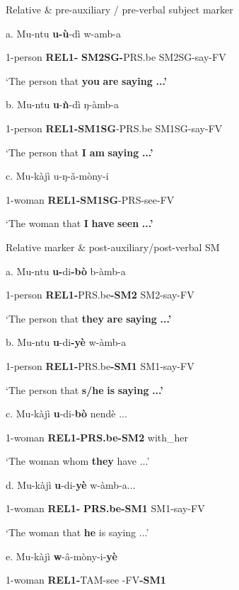 \documentclass[output=paper]{langscibook}
\begin{document}
\ea%
    \label{ex:lukusa:62}
    \z

          Relative \& pre-auxiliary / pre-verbal subject marker

a.  Mu-ntu    \textbf{u-ù}{}-dì            w-amb-a  

1-person  \textbf{REL1-}  \textbf{SM2SG-}PRS.be  SM2SG-say-FV

\glt ‘The person that \textbf{you} \textbf{are} \textbf{saying} \textbf{...’}

b.  Mu-ntu    \textbf{u}{}-{\textbf{ǹ}}{}-dì            ŋ-àmb-a

1-person  \textbf{REL1-SM1SG}{}-PRS.be  SM1SG-say-FV  

\glt ‘The person that \textbf{I} \textbf{am} \textbf{saying} \textbf{...’}

c.   Mu-kàjì      u-ŋ-{ǎ}{}-mòny-i

1-woman    \textbf{REL1-SM1SG}{}-PRS-see-FV

\glt ‘The woman that \textbf{I} \textbf{have} \textbf{seen} \textbf{...’}

\ea%
    \label{ex:lukusa:63}
    \z

          Relative marker \& post-auxiliary/post-verbal SM

a.   Mu-ntu    \textbf{u{}-}di\textbf{{}-bò}          b-àmb-a  

1-person  \textbf{REL1-}PRS.be\textbf{{}-SM2} SM2-say-FV

\glt ‘The person that \textbf{they} \textbf{are} \textbf{saying} \textbf{...’}

b.   Mu-ntu    \textbf{u}{}-di\textbf{{}-yè}            w-àmb-a

1-person  \textbf{REL1-}PRS.be\textbf{{}-SM1}    SM1-say-FV  

\glt ‘The person that \textbf{s/he} \textbf{is} \textbf{saying} \textbf{...’}

c.  Mu-kàjì    \textbf{u}{}-di-\textbf{bò}          nendè ...  

1-woman  \textbf{REL1-PRS.be-SM2}  with\_her

\glt ‘The woman whom \textbf{they} have ...’

d.   Mu-kàjì    \textbf{u}{}-di-\textbf{yè}            w-àmb-a...

1-woman  \textbf{REL1-}  \textbf{PRS.be-SM1}    SM1-say-FV

\glt ‘The woman that \textbf{he} is saying ...’

e.   Mu-kàjì      \textbf{w}{}-â-mòny-i-\textbf{yè}  

1-woman    \textbf{REL1-}TAM-see  {}-FV\textbf{{}-SM1}
\end{document}
